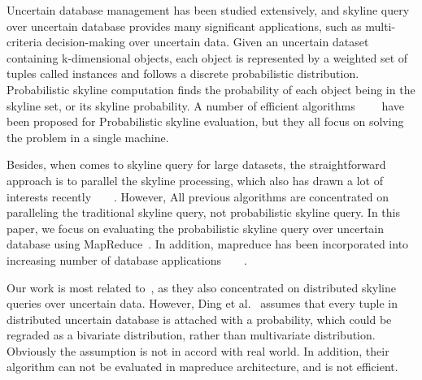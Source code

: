Uncertain database management has been studied extensively, and skyline query over uncertain database provides many significant applications, such as multi-criteria decision-making over uncertain data. Given an uncertain dataset containing k-dimensional objects, each object is represented by a weighted set of tuples called instances and follows a discrete probabilistic distribution. Probabilistic skyline computation finds the probability of each object being in the skyline set, or its skyline probability. A number of efficient algorithms~\cite{pei2007}~\cite{atallah2009}~\cite{bohm2009}~\cite{kim2011} have been proposed for Probabilistic skyline evaluation, but they all focus on solving the problem in a single machine.

Besides, when comes to skyline query for large datasets, the straightforward approach is to parallel the skyline processing, which also has drawn a lot of interests recently~\cite{ref:SkylineQueries}~\cite{ref:SkylineMulticore}~\cite{ref:SkylineDistributed}~\cite{ref:RandomPartition}. However, All previous algorithms are concentrated on paralleling the traditional skyline query, not probabilistic skyline query. In this paper, we focus on evaluating the probabilistic skyline query over uncertain database using MapReduce~\cite{ref:MapReduce}. In addition, mapreduce has been incorporated into increasing number of database applications~\cite{ref:KNNMapReduce}~\cite{ref:KNNJoin}~\cite{ref:SetSimilarity}~\cite{ref:ThetaJoins}.

Our work is most related to~\cite{ding2012}, as they also concentrated on distributed skyline queries over uncertain data. However, Ding et al.~\cite{ding2012} assumes that every tuple in distributed uncertain database is attached with a probability, which could be regraded as a bivariate distribution, rather than multivariate distribution. Obviously the assumption is not in accord with real world. In addition, their algorithm can not be evaluated in mapreduce architecture, and is not efficient.



